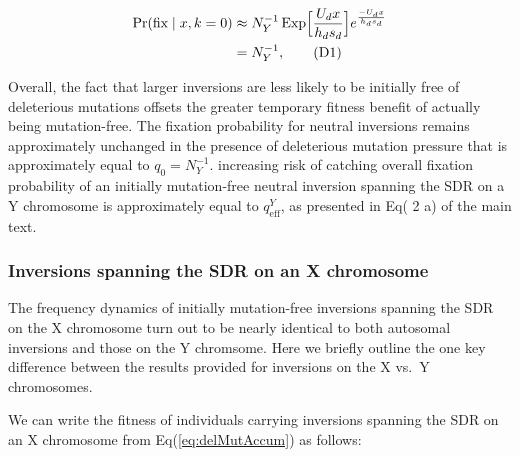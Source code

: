 \documentclass{article}
\newcommand\hl[1]{%
  \bgroup
  \hskip0pt\color{blue!80!black}%
  #1%
  \egroup
}
\newcommand\numberthis{\addtocounter{equation}{1}\tag{\theequation}}
\begin{document}
\begin{align*}\label{eq:NeutralYinvPFix}
		\Pr(\text{fix} \mid x, k = 0) &\approx N^{-1}_Y \, \text{Exp}\Big[ \frac{U_d x}{h_d s_d} \Big] e^{\frac{-U_d x}{h_d s_d}} \\
		 &= N^{-1}_Y , \numberthis
\end{align*}

Overall, the fact that larger inversions are less likely to be initially free of deleterious mutations offsets the greater temporary fitness benefit of actually being mutation-free. The fixation probability for neutral inversions remains approximately unchanged in the presence of deleterious mutation pressure that is approximately equal to $q_0 = N^{-1}_Y$. increasing risk of catching overall fixation probability of an initially mutation-free neutral inversion spanning the SDR on a Y chromosome is approximately equal to $q^Y_{\text{eff}}$, as presented in Eq(\hl{2}a) of the main text.



\subsubsection*{Inversions spanning the SDR on an X chromosome}

The frequency dynamics of initially mutation-free inversions spanning the SDR on the X chromosome turn out to be nearly identical to both autosomal inversions and those on the Y chromsome. Here we briefly outline the one key difference between the results provided for inversions on the X vs.~Y chromosomes. 

We can write the fitness of individuals carrying inversions spanning the SDR on an X chromosome from Eq(\ref{eq:delMutAccum}) as follows:
\end{document}
